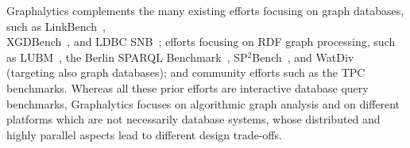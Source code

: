 Graphalytics complements the many existing efforts focusing on graph databases, such as 
LinkBench~\cite{DBLP:conf/sigmod/ArmstrongPBC13}, 
\\XGDBench~\cite{DBLP:journals/ase/DayarathnaS14}, and 
LDBC SNB~\cite{DBLP:conf/sigmod/ErlingALCGPPB15};  
efforts focusing on RDF graph processing, such as 
LUBM~\cite{DBLP:journals/ws/GuoPH05},
the Berlin {SPARQL} Benchmark~\cite{DBLP:journals/ijswis/BizerS09},
SP$^2$Bench~\cite{DBLP:conf/icde/SchmidtHLP09},
and WatDiv~\cite{DBLP:conf/semweb/AlucHOD14} (targeting also graph databases);
and community efforts such as the TPC benchmarks.
Whereas all these prior efforts are interactive database query benchmarks, Graphalytics focuses on algorithmic graph analysis and on different platforms which are not necessarily database systems, whose distributed and highly parallel aspects lead to different design trade-offs.


